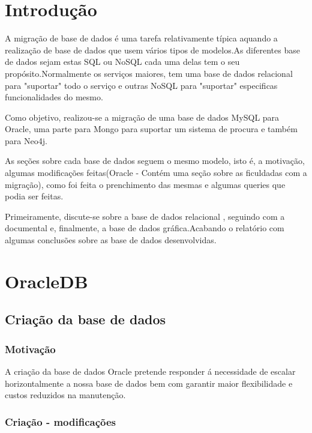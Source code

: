 \section{Introdução}

A migração de base de dados é uma tarefa relativamente típica aquando a realização de base de dados que usem vários tipos de modelos.As diferentes base de dados sejam estas SQL ou NoSQL cada uma delas tem o seu propósito.Normalmente os serviços maiores, tem uma base de dados relacional para "suportar" todo o serviço e outras NoSQL para "suportar" especificas funcionalidades do mesmo.

Como objetivo, realizou-se a migração de uma base de dados MySQL para Oracle, uma parte para Mongo para suportar um sistema de procura e também para Neo4j.

As seções sobre cada base de dados seguem o mesmo modelo, isto é, a motivação, algumas modificações feitas(Oracle - Contém uma seção sobre as ficuldadas com a migração), como foi feita o prenchimento das mesmas e algumas queries que podia ser feitas.

Primeiramente, discute-se sobre a base de dados relacional , seguindo com a documental e, finalmente, a base de dados gráfica.Acabando o relatório com algumas conclusões sobre as base de dados desenvolvidas.


\section{OracleDB}

\subsection{Criação da base de dados}

\subsubsection{Motivação}

\par A criação da base de dados Oracle pretende responder á necessidade de escalar horizontalmente a nossa base de dados bem com garantir maior flexibilidade e custos reduzidos na manutenção.

\subsubsection{Criação - modificações}

